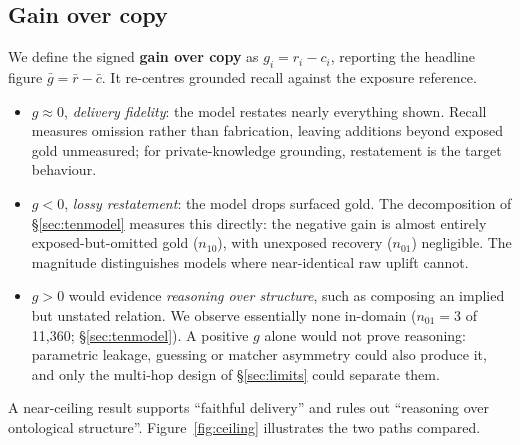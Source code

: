 \documentclass[10pt,twocolumn]{article}
\begin{document}
\subsection{Gain over copy}
We define the signed \textbf{gain over copy} as $g_i=r_i-c_i$, reporting the headline figure $\bar g=\bar r-\bar c$. It re-centres grounded recall against the exposure reference.
\begin{itemize}[topsep=2pt,itemsep=1pt,leftmargin=1.4em]
\item $g\approx0$, \emph{delivery fidelity}: the model restates nearly everything shown. Recall measures omission rather than fabrication, leaving additions beyond exposed gold unmeasured; for private-knowledge grounding, restatement is the target behaviour.
\item $g<0$, \emph{lossy restatement}: the model drops surfaced gold. The decomposition of \S\ref{sec:tenmodel} measures this directly: the negative gain is almost entirely exposed-but-omitted gold ($n_{10}$), with unexposed recovery ($n_{01}$) negligible. The magnitude distinguishes models where near-identical raw uplift cannot.
\item $g>0$ would evidence \emph{reasoning over structure}, such as composing an implied but unstated relation. We observe essentially none in-domain ($n_{01}=3$ of 11{,}360; \S\ref{sec:tenmodel}). A positive $g$ alone would not prove reasoning: parametric leakage, guessing or matcher asymmetry could also produce it, and only the multi-hop design of \S\ref{sec:limits} could separate them.
\end{itemize}
A near-ceiling result supports ``faithful delivery'' and rules out ``reasoning over ontological structure''. Figure~\ref{fig:ceiling} illustrates the two paths compared.


\end{document}
